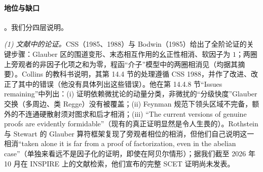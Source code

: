 \paragraph{地位与缺口}\tagA。我们分四层说明。

\emph{(1) 文献中的论证。}CSS（1985、1988）与 Bodwin（1985）给出了全阶论证的关键步骤\cite{CollinsSoperSterman1985b,CollinsSoperSterman1988,Bodwin1985}：Glauber 区的围道变形、末态相互作用的幺正性相消、软因子为 $1$；两圈上旁观者的非因子化项之和为零\cite{Lindsay:1982pu,Lindsay:1982gd}，程函“介子”模型中的两圈相消见\cite{Brandt:1988xt}（均据其摘要）。Collins 的教科书说明，其第 14.4 节的处理遵循 CSS 1988，并作了改进、改正了其中的错误（他没有具体列出这些错误）\cite[第~14.4~节，第~553~页]{Collins2011}。他在第 14.4.8 节“Issues remaining”中列出：(i) 证明依赖微扰论的动量分类，非微扰的“分级快度”Glauber 交换（多周边、类 Regge）没有被覆盖；(ii) Feynman 规范下领头区域不完备，额外的不连通硬散射须对图求和后才相消\cite{Labastida:1984gy}；(iii) “The current versions of genuine proofs are evidently formidable”（现有的真正证明显然是令人生畏的）\cite[第~14.4.8~节]{Collins2011}。Rothstein 与 Stewart 的 Glauber 算符框架复现了旁观者相位的相消，但他们自己说明这一相消“taken alone it is far from a proof of factorization, even in the abelian case”（单独来看远不是因子化的证明，即使在阿贝尔情形）\cite[第~11.1~节]{RothsteinStewart2016}；据我们截至 2026 年 10 月在 INSPIRE 上的文献检索，他们宣布的完整 SCET 证明尚未发表。

